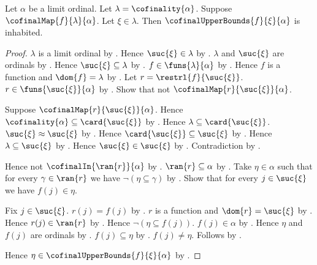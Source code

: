 \begin{lemma}\label{cofinal_upper_bounds_inhabited}
    Let $\alpha$ be a limit ordinal.
    Let $\lambda=\cofinality{\alpha}$.
    Suppose $\cofinalMap{f}{\lambda}{\alpha}$.
    Let $\xi\in\lambda$.
    Then $\cofinalUpperBounds{f}{\xi}{\alpha}$ is inhabited.
\end{lemma}
\begin{proof}
    $\lambda$ is a limit ordinal
        by .
    Hence $\suc{\xi}\in\lambda$ by .
    $\lambda$ and $\suc{\xi}$ are ordinals
        by .
    Hence $\suc{\xi}\subseteq\lambda$
        by .
    $f\in\funs{\lambda}{\alpha}$ by .
    Hence $f$ is a function and $\dom{f}=\lambda$
        by .
    Let $r=\restrl{f}{\suc{\xi}}$.
    $r\in\funs{\suc{\xi}}{\alpha}$ by .
    Show that not $\cofinalMap{r}{\suc{\xi}}{\alpha}$.
    \begin{subproof}
        Suppose $\cofinalMap{r}{\suc{\xi}}{\alpha}$.
        Hence $\cofinality{\alpha}\subseteq\card{\suc{\xi}}$
            by .
        Hence $\lambda\subseteq\card{\suc{\xi}}$.
        $\suc{\xi}\approx\suc{\xi}$ by .
        Hence $\card{\suc{\xi}}\subseteq\suc{\xi}$
            by .
        Hence $\lambda\subseteq\suc{\xi}$
            by .
        Hence $\suc{\xi}\in\suc{\xi}$ by .
        Contradiction by .
    \end{subproof}
    Hence not $\cofinalIn{\ran{r}}{\alpha}$
        by .
    $\ran{r}\subseteq\alpha$ by .
    Take $\eta\in\alpha$ such that for every $\gamma\in\ran{r}$
        we have $\lnot(\eta\subseteq\gamma)$ by .
    Show that for every $j\in\suc{\xi}$ we have $f(j)\in\eta$.
    \begin{subproof}
        Fix $j\in\suc{\xi}$.
        $r(j)=f(j)$ by .
        $r$ is a function and $\dom{r}=\suc{\xi}$
            by .
        Hence $r(j)\in\ran{r}$ by .
        Hence $\lnot(\eta\subseteq f(j))$.
        $f(j)\in\alpha$ by .
        Hence $\eta$ and $f(j)$ are ordinals
            by .
        $f(j)\subseteq\eta$ by .
        $f(j)\neq\eta$.
        Follows by .
    \end{subproof}
    Hence $\eta\in\cofinalUpperBounds{f}{\xi}{\alpha}$
        by .
\end{proof}

